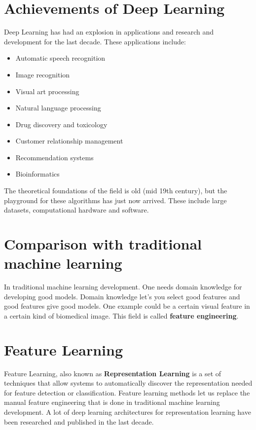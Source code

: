 \section{Achievements of Deep Learning}
Deep Learning has had an explosion in applications and research and development
for the last decade. These applications include:

\begin{itemize}
    \item Automatic speech recognition
    \item Image recognition
    \item Visual art processing
    \item Natural language processing
    \item Drug discovery and toxicology
    \item Customer relationship management
    \item Recommendation systems
    \item Bioinformatics
\end{itemize}

The theoretical foundations of the field is old (mid 19th century), but the 
playground for these algorithms has just now arrived. These include large
datasets, computational hardware and software. 

\section{Comparison with traditional machine learning}
In traditional machine learning development. One needs domain knowledge for
developing good models. Domain knowledge let's you select good features 
and good features give good models. One example could be a certain visual
feature in a certain kind of biomedical image. This field is called 
\textbf{feature engineering}. 

\section{Feature Learning}
Feature Learning, also known as \textbf{Representation Learning} is a set of
techniques that allow systems to automatically discover the representation 
needed for feature detection or classification. Feature learning methods 
let us replace the manual feature engineering that is done in traditional 
machine learning development. A lot of deep learning architectures for 
representation learning have been researched and published in the last decade.

